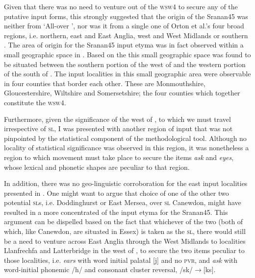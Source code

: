 Given that there was no need to venture out of the \textsc{wsw4} to secure any of the putative input forms, this strongly suggested that the origin of the Sranan45 was neither from `All-over ', nor was it from a single one of Orton et al.'s four broad regions, i.e. northern, east and East Anglia, west and West Midlands or southern  \citep{Orton6271}. The area of origin for the Sranan45 input etyma was in fact observed within a small geographic space in . Based on the  this small geographic space was found to be situated between the southern portion of the west of  and the western portion of the south of . The input localities in this small geographic area were observable in four counties that border each other. These are Monmouthshire, Gloucestershire, Wiltshire and Somersetshire; the four counties which together constitute the \textsc{wsw4}.

Furthermore, given the significance of the west of , to which we must travel irrespective of \textsc{sl}, I was presented with another region of input that was not pinpointed by the statistical component of the methodological tool. Although no locality of statistical significance was observed in this region, it was nonetheless a region to which movement must take place to secure the items \emph{ask} and \emph{eyes}, whose lexical and phonetic shapes are peculiar to that region.

In addition, there was no geo-linguistic corroboration for the east  input localities presented in . One might want to argue that choice of one of the other two potential \textsc{sl}s, i.e. Doddinghurst or East Mersea, over \textsc{sl} Canewdon, might have resulted in a more concentrated  of the input etyma for the Sranan45. This argument can be dispelled based on the fact that whichever of the two (both of which, like Canewdon, are situated in Essex) is taken as the \textsc{sl}, there would still be a need to venture across East Anglia through the West Midlands to localities Llanfrechfa and Latterbridge in the west of , to secure the two items peculiar to those localities, i.e. \emph{ears} with word initial palatal [j] and no \textsc{pvr}, and \emph{ask} with word-initial phonemic /h/ and consonant cluster reversal, /sk/$\rightarrow$[ks].

